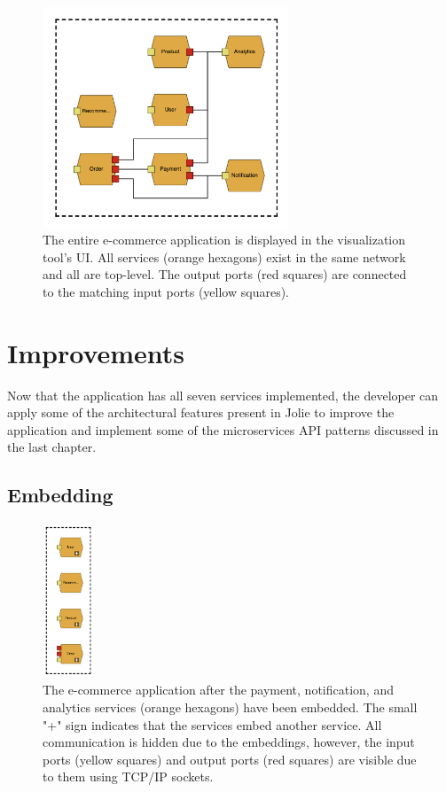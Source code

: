 \begin{figure}[t]
    \center
    \includegraphics[width=0.65\textwidth]{figures/jv_completed.png}
    \caption{The entire e-commerce application is displayed in the visualization tool's UI. All services (orange hexagons) exist in the same network and all are top-level.
    The output ports (red squares) are connected to the matching input ports (yellow squares).}
    \label{figure:jv_completed}
\end{figure}

\section{Improvements}
Now that the application has all seven services implemented, the developer can apply some of the architectural features present in Jolie to improve the application and implement some of the microservices API patterns discussed in the last chapter.

\subsection{Embedding}
\begin{figure}[t]
    \center
    \includegraphics[width=0.14\textwidth]{figures/jv_embedded.png}
    \caption{The e-commerce application after the payment, notification, and analytics services (orange hexagons) have been embedded. The small "+" sign indicates that the services embed another service.
    All communication is hidden due to the embeddings, however, the input ports (yellow squares) and output ports (red squares) are visible due to them using TCP/IP sockets.}
    \label{figure:jv_embedded}
\end{figure}


